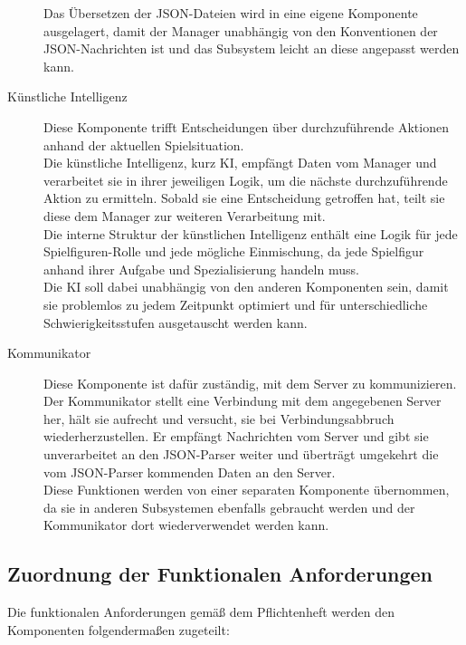 \begin{description}
	Das Übersetzen der JSON-Dateien wird in eine eigene Komponente ausgelagert, damit der Manager unabhängig von den Konventionen der JSON-Nachrichten ist und das Subsystem leicht an diese angepasst werden kann.
	\\
	\item[Künstliche Intelligenz] 
	Diese Komponente trifft Entscheidungen über durchzuführende Aktionen anhand der aktuellen Spielsituation.\\
	Die künstliche Intelligenz, kurz KI, empfängt Daten vom Manager und verarbeitet sie in ihrer jeweiligen Logik, um die nächste durchzuführende Aktion zu ermitteln. Sobald sie eine Entscheidung getroffen hat, teilt sie diese dem Manager zur weiteren Verarbeitung mit.\\
	Die interne Struktur der künstlichen Intelligenz enthält eine Logik für jede Spielfiguren-Rolle und jede mögliche Einmischung, da jede Spielfigur anhand ihrer Aufgabe und Spezialisierung handeln muss.\\
	Die KI soll dabei unabhängig von den anderen Komponenten sein, damit sie problemlos zu jedem Zeitpunkt optimiert und für unterschiedliche Schwierigkeitsstufen ausgetauscht werden kann.
	\\
	\item[Kommunikator]
	Diese Komponente ist dafür zuständig, mit dem Server zu kommunizieren.\\
	Der Kommunikator stellt eine Verbindung mit dem angegebenen Server her, hält sie aufrecht und versucht, sie bei Verbindungsabbruch wiederherzustellen. Er empfängt Nachrichten vom Server und gibt sie unverarbeitet an den JSON-Parser weiter und überträgt umgekehrt die vom JSON-Parser kommenden Daten an den Server.\\
	Diese Funktionen werden von einer separaten Komponente übernommen, da sie in anderen Subsystemen ebenfalls gebraucht werden und der Kommunikator dort wiederverwendet werden kann. 
\end{description}

\subsection{Zuordnung der Funktionalen Anforderungen}

Die funktionalen Anforderungen gemäß dem Pflichtenheft werden den Komponenten folgendermaßen zugeteilt:

